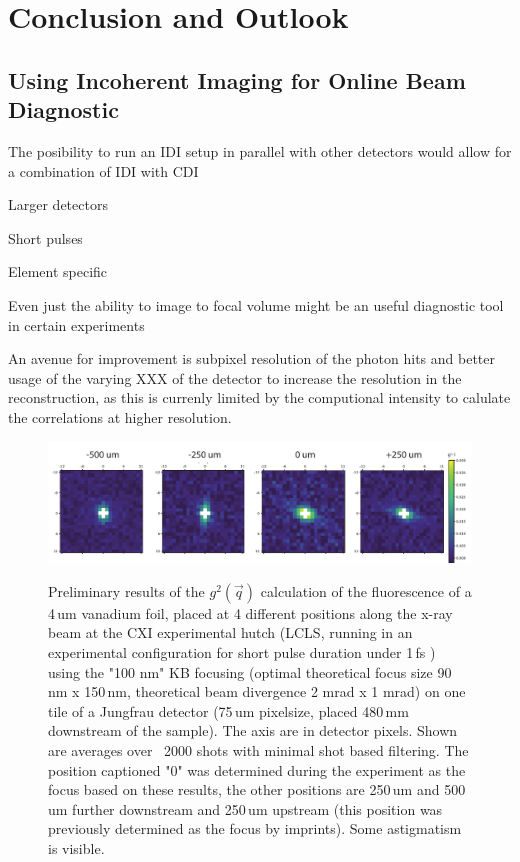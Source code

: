\chapter{Conclusion and Outlook}


\section{Using Incoherent Imaging for Online Beam Diagnostic}



The posibility to run an IDI setup in parallel with other detectors would allow for a combination of IDI with CDI

Larger detectors

Short pulses

Element specific 


Even just the ability to image to focal volume might be an useful diagnostic tool in certain experiments


An avenue for improvement is subpixel resolution of the photon hits and better usage of the varying XXX of the detector to increase the resolution in the reconstruction, as this is currenly limited by the computional intensity to calulate the correlations at higher resolution.


\begin{figure}
	\centering
	\includegraphics[width=\linewidth]{images/lv65_vanadium.pdf}
	\label{fig:outlook_vanadium}
	\caption[Focus finding using IDI]{Preliminary results of the $g^2(\vec{q})$ calculation of the fluorescence of a 4\,um vanadium foil, placed at 4 different positions along the x-ray beam at the CXI experimental hutch (LCLS, running in an experimental configuration for short pulse duration under 1\,fs \cite{argosecond}) using the "100 nm" KB focusing (optimal theoretical focus size 90\,nm x 150\,nm, theoretical beam divergence 2 mrad x 1 mrad) on one tile of a Jungfrau detector (75\,um pixelsize, placed 480\,mm downstream of the sample). The axis are in detector pixels. Shown are averages over ~2000 shots with minimal shot based filtering. The position captioned "0" was determined during the experiment as the focus based on these results, the other positions are 250\,um and 500\,um further downstream and 250\,um upstream (this position was previously determined as the focus by imprints).  Some astigmatism is visible.}
\end{figure}

